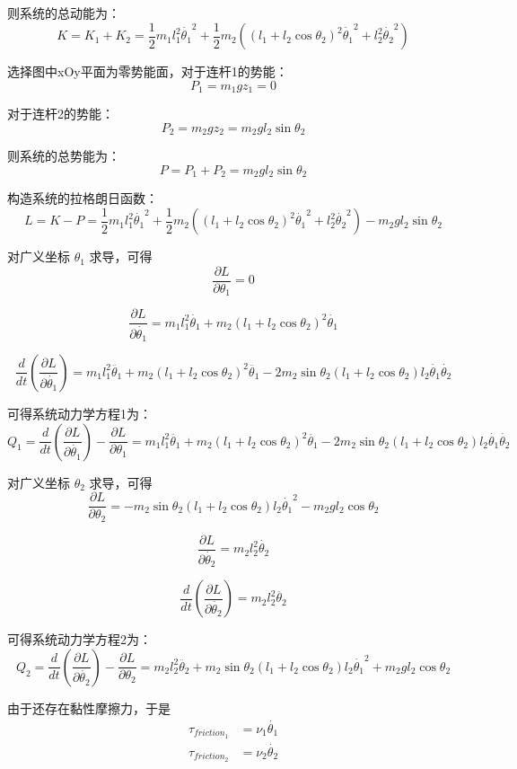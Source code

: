 \documentclass{homework}
\begin{document}
\begin{sol}
则系统的总动能为：
\[
  K = K_1 + K_2 = \frac{1}{2} m_1 l_1^2 \dot{\theta_1}^2 + \frac{1}{2} m_2 ((l_1 + l_2 \cos\theta_2)^2 \dot{\theta_1}^2 + l_2^2 \dot{\theta_2}^2)
\]  

选择图中xOy平面为零势能面，对于连杆1的势能：
\[
  P_1 = m_1 g z_1 = 0
\]

对于连杆2的势能：
\[
  P_2 = m_2 g z_2 = m_2 g l_2 \sin\theta_2
\]

则系统的总势能为：
\[
  P = P_1 + P_2 = m_2 g l_2 \sin\theta_2
\]

构造系统的拉格朗日函数：
\[
  L = K - P = \frac{1}{2} m_1 l_1^2 \dot{\theta_1}^2 + \frac{1}{2} m_2 ((l_1 + l_2 \cos\theta_2)^2 \dot{\theta_1}^2 + l_2^2 \dot{\theta_2 }^2) - m_2 g l_2 \sin\theta_2
\]

对广义坐标 $ \theta_1 $ 求导，可得
\[
  \frac{\partial L}{\partial \theta_1} = 0
\]

\[
  \frac{\partial L}{\partial \dot{\theta_1}} = m_1 l_1^2 \dot{\theta_1} + m_2 (l_1 + l_2 \cos\theta_2)^2 \dot{\theta_1}
\]

\[
  \frac{d}{dt}(\frac{\partial L}{\partial \dot{\theta_1}}) = m_1 l_1^2 \ddot{\theta_1} + m_2 (l_1 + l_2 \cos\theta_2)^2 \ddot{\theta_1} - 2 m_2 \sin\theta_2 (l_1 + l_2 \cos\theta_2) l_2 \dot{\theta_1} \dot{\theta_2} 
\]

可得系统动力学方程1为：
\[
  Q_1 = \frac{d}{dt}(\frac{\partial L}{\partial \dot{\theta_1}}) - \frac{\partial L}{\partial \theta_1} =  m_1 l_1^2 \ddot{\theta_1} + m_2 (l_1 + l_2 \cos\theta_2)^2 \ddot{\theta_1} - 2 m_2 \sin\theta_2 (l_1 + l_2 \cos\theta_2) l_2 \dot{\theta_1} \dot{\theta_2} 
\]

对广义坐标 $ \theta_2 $ 求导，可得
\[
  \frac{\partial L}{\partial \theta_2} = - m_2 \sin\theta_2 (l_1 + l_2 \cos\theta_2) l_2 \dot{\theta_1}^2 - m_2 g l_2 \cos\theta_2
\]

\[
  \frac{\partial L}{\partial \dot{\theta_2}} = m_2 l_2^2 \dot{\theta_2}
\]

\[
  \frac{d}{dt}(\frac{\partial L}{\partial \dot{\theta_2}}) = m_2 l_2^2 \ddot{\theta_2}
\]

可得系统动力学方程2为：
\[
  Q_2 = \frac{d}{dt}(\frac{\partial L}{\partial \dot{\theta_2}}) - \frac{\partial L}{\partial \theta_2} = m_2 l_2^2 \ddot{\theta_2} + m_2 \sin\theta_2 (l_1 + l_2 \cos\theta_2) l_2 \dot{\theta_1}^2 + m_2 g l_2 \cos\theta_2
\]

由于还存在黏性摩擦力，于是
\begin{align*}
  \tau_{friction_1} &= \nu_1 \dot{\theta_1} \\
  \tau_{friction_2} &= \nu_2 \dot{\theta_2} 
\end{align*}
  

\end{sol}
\end{document}
